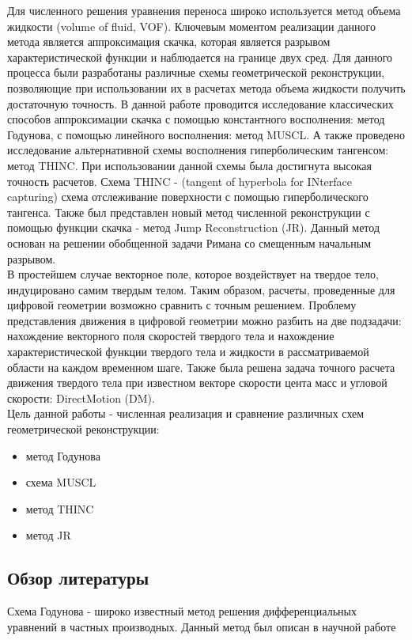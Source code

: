 \documentclass[12pt,a4paper]{article}
\begin{document}
Для численного решения уравнения переноса широко используется метод объема жидкости (volume of fluid, VOF). Ключевым моментом реализации данного метода является аппроксимация скачка, которая является разрывом характеристической функции и наблюдается на границе двух сред. Для данного процесса были разработаны различные схемы геометрической реконструкции, позволяющие при использовании их в расчетах метода объема жидкости получить достаточную точность. В данной работе проводится исследование классических способов аппроксимации скачка с помощью константного восполнения: метод Годунова, с помощью линейного восполнения: метод MUSCL. А также проведено исследование альтернативной схемы восполнения гиперболическим тангенсом: метод THINC. При использовании данной схемы была достигнута высокая точность расчетов. Схема THINC - (tangent of hyperbola for INterface capturing) схема отслеживание поверхности с помощью гиперболического тангенса. Также был представлен новый метод численной реконструкции с помощью функции скачка - метод Jump Reconstruction (JR). Данный метод основан на решении обобщенной задачи Римана со смещенным начальным разрывом.\\
В простейшем случае векторное поле, которое воздействует на твердое тело, индуцировано самим твердым телом. Таким образом, расчеты, проведенные для цифровой геометрии возможно сравнить с точным решением. Проблему представления движения в цифровой геометрии можно разбить на две подзадачи: нахождение векторного поля скоростей твердого тела и нахождение характеристической функции твердого тела и жидкости в рассматриваемой области на каждом временном шаге. Также была решена задача точного расчета движения твердого тела при известном векторе скорости цента масс и угловой скорости: DirectMotion (DM).\\
Цель данной работы - численная реализация и сравнение различных схем геометрической реконструкции:
\begin{itemize}
  \item метод Годунова
  \item схема MUSCL
  \item метод THINC
  \item метод JR
\end{itemize}


\subsection{Обзор литературы}
Схема Годунова - широко известный метод решения дифференциальных уравнений в частных производных. Данный метод был описан в научной работе \citep{Godunov_num_method} 
\end{document}
